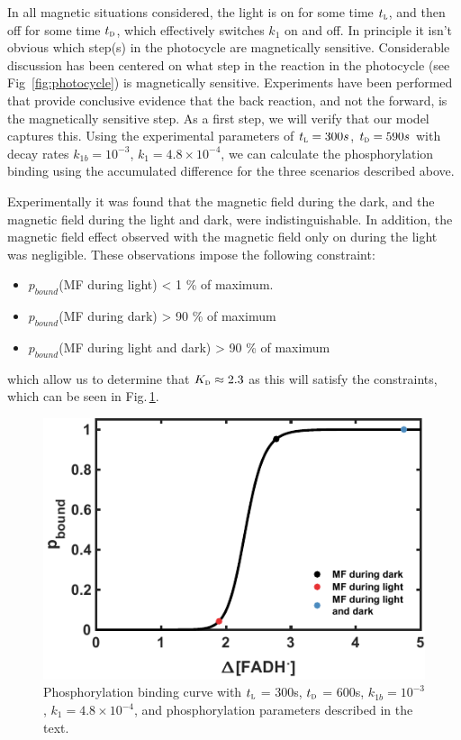 \documentclass[twoside,twocolumn,9pt]{article}
\begin{document}
In all magnetic situations considered, the light is on for some time $t_{\textsc{l}}$, and then off for some time $t_{\textsc{d}}$, which effectively switches $k_{1}$ on and off. In principle it isn't obvious which step(s) in the photocycle are magnetically sensitive. Considerable discussion has been centered on what step in the reaction in the photocycle (see Fig~\ref{fig:photocycle}) is magnetically sensitive. Experiments have been performed that provide conclusive evidence that the back reaction, and not the forward, is the magnetically sensitive step. As a first step, we will verify that our model captures this. Using the experimental parameters \cite{Pooam2019} of $t_{\textsc{l}} = 300s$, $t_{\textsc{d}} = 590s$ with decay rates $k_{1b} = 10^{-3}$, $k_{1} = 4.8 \times 10^{-4}$, \cite{Procopio2016} we can calculate the phosphorylation binding using the accumulated difference for the three scenarios described above.

Experimentally it was found that the magnetic field during the dark, and the magnetic field during the light and dark, were indistinguishable. \cite{Pooam2019} In addition, the magnetic field effect observed with the magnetic field only on during the light was negligible. These observations impose the following constraint:
\begin{itemize}
	\item $p_{bound}$(MF during light) < 1 \% of maximum.
	\item $p_{bound}$(MF during dark) > 90 \% of maximum
	\item $p_{bound}$(MF during light and dark) > 90 \% of maximum
\end{itemize}
which allow us to determine that $K_{\textsc{d}} \approx 2.3$ as this will satisfy the constraints, which can be seen in Fig.\,\ref{fig:sigmoid}.
\begin{figure}[h]
	\centering
	\includegraphics{sigmoid.pdf}
	\caption{Phosphorylation binding curve with $t_{\textsc{l}}$ = 300s, $t_{\textsc{d}}$ = 600s, $k_{1b} = 10^{-3}$, $k_{1} = 4.8 \times 10^{-4}$, and phosphorylation parameters described in the text.}
	\label{fig:sigmoid}
\end{figure}
\end{document}
